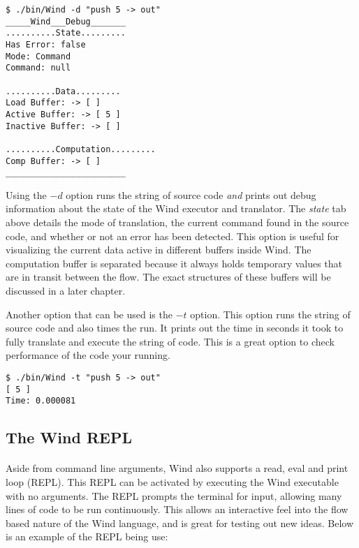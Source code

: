 \begin{verbatim}
$ ./bin/Wind -d "push 5 -> out"
_____Wind___Debug_______
..........State.........
Has Error: false
Mode: Command
Command: null

..........Data.........
Load Buffer: -> [ ]
Active Buffer: -> [ 5 ]
Inactive Buffer: -> [ ]

..........Computation.........
Comp Buffer: -> [ ]
________________________
\end{verbatim}

\par Using the $-d$ option runs the string of source code \emph{and} prints out debug information about the state of the Wind executor and translator. The \emph{state} tab above details the mode of translation, the current command found in the source code, and whether or not an error has been detected. This option is useful for visualizing the current data active in different buffers inside Wind. The computation buffer is separated because it always holds temporary values that are in transit between the flow. The exact structures of these buffers will be discussed in a later chapter.
\par Another option that can be used is the $-t$ option. This option runs the string of source code and also times the run. It prints out the time in seconds it took to fully translate and execute the string of code. This is a great option to check performance of the code your running.

\begin{verbatim}
$ ./bin/Wind -t "push 5 -> out"
[ 5 ]
Time: 0.000081
\end{verbatim}

\subsection{The Wind REPL}

\paragraph{  } Aside from command line arguments, Wind also supports a read, eval and print loop (REPL). This REPL can be activated by executing the Wind executable with no arguments. The REPL prompts the terminal for input, allowing many lines of code to be run continuously. This allows an interactive feel into the flow based nature of the Wind language, and is great for testing out new ideas. Below is an example of the REPL being use:


